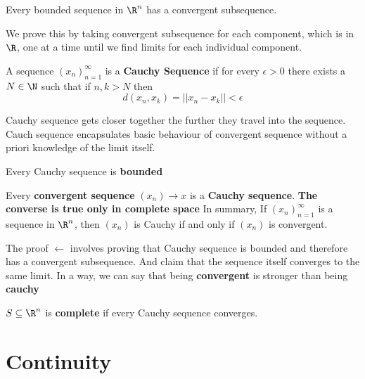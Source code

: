 \documentclass[11pt]{article}
\begin{document}
\begin{proposition*}
  Every bounded sequence in $\R^n$ has a convergent subsequence.
  \begin{rem}
    We prove this by taking convergent subsequence for each component, which is in $\R$, one at a time until we find limits for each individual component.
  \end{rem}
\end{proposition*}


\begin{defn*}
  A sequence $(x_n)_{n=1}^{\infty}$ is a \textbf{Cauchy Sequence} if for every $\epsilon > 0$ there exists a $N\in\N$ such that if $n,k>N$ then
  \[
    d(x_n, x_k) = ||x_n - x_k|| < \epsilon
  \]
  \begin{rem}
    Cauchy sequence gets closer together the further they travel into the sequence. Cauch sequence encapsulates basic behaviour of convergent sequence without a priori knowledge of the limit itself.
  \end{rem}
\end{defn*}

\begin{proposition*}
  Every Cauchy sequence is \textbf{bounded}
\end{proposition*}

\begin{proposition*}
  Every \textbf{convergent sequence} $(x_n) \to x$ is a \textbf{Cauchy sequence}. \textbf{The converse is true only in complete space} In summary, If $(x_n)_{n=1}^{\infty}$ is a sequence in $\R^n$, then $(x_n)$ is Cauchy if and only if $(x_n)$ is convergent.
  \begin{rem}
    The proof $\leftarrow$ involves proving that Cauchy sequence is bounded and therefore has a convergent subsequence. And claim that the sequence itself converges to the same limit. In a way, we can say that being \textbf{convergent} is stronger than being \textbf{cauchy}
  \end{rem}
\end{proposition*}

\begin{defn*}
  $S\subseteq \R^n$ is \textbf{complete} if every Cauchy sequence converges.
\end{defn*}

\section*{Continuity}
\end{document}
